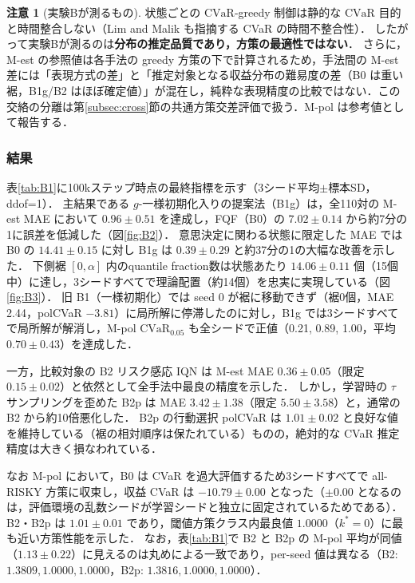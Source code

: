 \documentclass[a4paper,10pt]{jsarticle}
\theoremstyle{definition}
\newtheorem{remark}{注意}[section]
\newcommand{\CVaR}{\mathrm{CVaR}}
\begin{document}
\begin{remark}[実験Bが測るもの]
状態ごとの $\CVaR$-greedy 制御は静的な $\CVaR$ 目的と時間整合しない（Lim and Malik \cite{lim2022distributional} も指摘する CVaR の時間不整合性）．
したがって実験Bが測るのは\textbf{分布の推定品質であり，方策の最適性ではない}．
さらに，M-est の参照値は各手法の greedy 方策の下で計算されるため，手法間の M-est 差には「表現方式の差」と「推定対象となる収益分布の難易度の差（B0 は重い裾，B1g/B2 はほぼ確定値）」が混在し，純粋な表現精度の比較ではない．この交絡の分離は第\ref{subsec:cross}節の共通方策交差評価で扱う．M-pol は参考値として報告する．
\end{remark}

\subsubsection{結果}
表\ref{tab:B1}に100kステップ時点の最終指標を示す（3シード平均$\pm$標本SD，ddof=1）．
主結果である $g$-一様初期化入りの提案法（B1g）は，全110対の M-est MAE において $0.96\pm0.51$ を達成し，FQF（B0）の $7.02\pm0.14$ から約7分の1に誤差を低減した（図\ref{fig:B2}）．
意思決定に関わる状態に限定した MAE では B0 の $14.41\pm0.15$ に対し B1g は $0.39\pm0.29$ と約37分の1の大幅な改善を示した．
下側裾 $[0,\alpha]$ 内のquantile fraction数は状態あたり $14.06\pm0.11$ 個（15個中）に達し，3シードすべてで理論配置（約14個）を忠実に実現している（図\ref{fig:B3}）．
旧 B1（一様初期化）では seed 0 が裾に移動できず（裾0個，MAE 2.44，polCVaR $-3.81$）に局所解に停滞したのに対し，B1g では3シードすべてで局所解が解消し，M-pol $\CVaR_{0.05}$ も全シードで正値（0.21, 0.89, 1.00，平均 $0.70\pm0.43$）を達成した．

一方，比較対象の B2 リスク感応 IQN は M-est MAE $0.36\pm0.05$（限定 $0.15\pm0.02$）と依然として全手法中最良の精度を示した．
しかし，学習時の $\tau$ サンプリングを歪めた B2p は MAE $3.42\pm1.38$（限定 $5.50\pm3.58$）と，通常の B2 から約10倍悪化した．
B2p の行動選択 polCVaR は $1.01\pm0.02$ と良好な値を維持している（裾の相対順序は保たれている）ものの，絶対的な CVaR 推定精度は大きく損なわれている．

なお M-pol において，B0 は CVaR を過大評価するため3シードすべてで all-RISKY 方策に収束し，収益 CVaR は $-10.79\pm0.00$ となった（$\pm0.00$ となるのは，評価環境の乱数シードが学習シードと独立に固定されているためである）．
B2・B2p は $1.01\pm0.01$ であり，閾値方策クラス内最良値 $1.0000$（$k^*=0$）に最も近い方策性能を示した．
なお，表\ref{tab:B1}で B2 と B2p の M-pol 平均が同値（$1.13\pm0.22$）に見えるのは丸めによる一致であり，per-seed 値は異なる（B2: $1.3809, 1.0000, 1.0000$，B2p: $1.3816, 1.0000, 1.0000$）．
\end{document}
